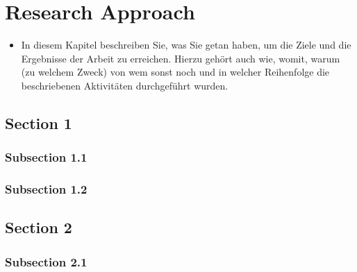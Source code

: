 
\chapter{Research Approach}

\label{chap:methods}

\begin{itemize}
  \item In diesem Kapitel beschreiben Sie, was Sie getan haben, um die Ziele und die Ergebnisse der Arbeit zu erreichen. Hierzu gehört auch wie, womit, warum (zu welchem Zweck) von wem sonst noch und in welcher Reihenfolge die beschriebenen Aktivitäten durchgeführt wurden.
\end{itemize}

\section{Section 1}

\subsection{Subsection 1.1}



\subsection{Subsection 1.2}



\section{Section 2}


\subsection{Subsection 2.1}


